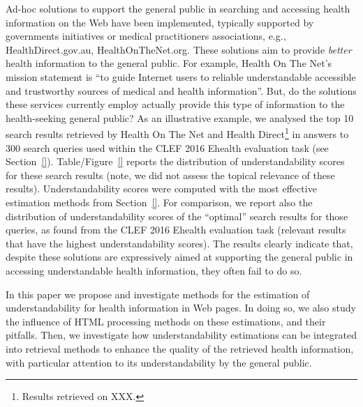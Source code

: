 Ad-hoc solutions to support the general public in searching and accessing health information on the Web have been implemented, typically supported by governments initiatives or medical practitioners associations, e.g., HealthDirect.gov.au, HealthOnTheNet.org. These solutions aim to provide \textit{better} health information to the general public. For example, Health On The Net's mission statement is ``to guide Internet users to reliable understandable accessible and trustworthy sources of medical and health information''. But, do the solutions these services currently employ actually provide this type of information to the health-seeking general public? As an illustrative example, we analysed the top 10 search results retrieved by Health On The Net and Health Direct\footnote{Results retrieved on XXX.} in answers to 300 search queries used within the CLEF 2016 Ehealth evaluation task (see Section~\ref{}). Table/Figure~\ref{} reports the distribution of understandability scores for these search results (note, we did not assess the topical relevance of these results). Understandability scores were computed with the most effective estimation methods from Section~\ref{}. For comparison, we report also the distribution of understandability scores of the ``optimal'' search results for those queries, as found from the CLEF 2016 Ehealth evaluation task (relevant results that have the highest understandability scores). The results clearly indicate that, despite these solutions are expressively aimed at supporting the general public in accessing understandable health information, they often fail to do so.

In this paper we propose and investigate methods for the estimation of understandability for health information in Web pages. In doing so, we also study the influence of HTML processing methods on these estimations, and their pitfalls. Then, we investigate how understandability estimations can be integrated into retrieval methods to enhance the quality of the retrieved health information, with particular attention to its understandability by the general public. 

